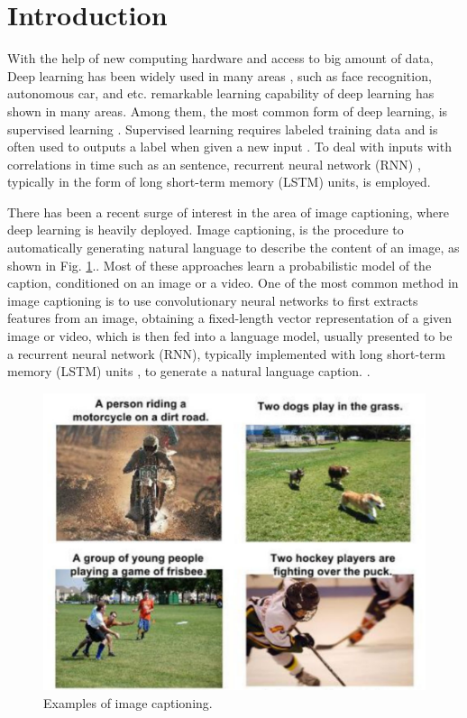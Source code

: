 \documentclass[conference]{IEEEtran}
\begin{document}
\IEEEpeerreviewmaketitle



\section{Introduction}

With the help of new computing hardware and access to big amount of data, Deep learning has been widely used in many areas \cite{krizhevsky2012imagenet}, such as face recognition, autonomous car, and etc. remarkable learning capability of deep learning has shown in many areas. Among them, the most common form of deep learning, is supervised learning \cite{lecun2015deep}. Supervised learning requires labeled training data and is often used to outputs a label when given a new input \cite{lecun1998gradient}. To deal with inputs with correlations in time such as an sentence, recurrent neural network (RNN) \cite{mikolov2010recurrent}, typically in the form of long short-term memory (LSTM) units, is employed.

There has been a recent surge of interest in the area of image captioning, where deep learning is heavily deployed. Image captioning, is the procedure to automatically generating natural language to describe the content of an image, as shown in Fig. \ref{cap_fig}.. Most of these approaches learn a probabilistic model of the caption, conditioned on an image or a video. One of the most common method in image captioning is to use convolutionary neural networks to first extracts features from an image, obtaining a fixed-length vector representation of a given image or video, which is then fed into a language model, usually presented to be a recurrent neural network (RNN), typically implemented with long short-term memory (LSTM) units \cite{graves2013speech}, to generate a natural language caption. \cite{vinyals2015show}.

\begin{figure}
  \centering
  \includegraphics[width=1.0\linewidth]{figures/caption.pdf}
  \caption{Examples of image captioning.}\label{cap_fig}
\end{figure}
\end{document}
